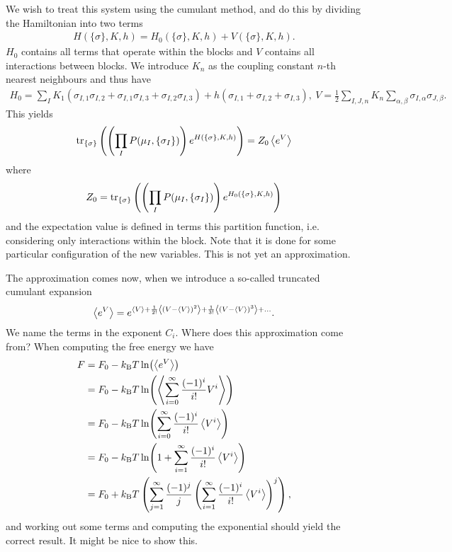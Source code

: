 We wish to treat this system using the cumulant method, and do this by dividing the Hamiltonian into two terms
\begin{align*}
	H(\{\sigma\}, K, h) = H_{0}(\{\sigma\}, K, h) + V(\{\sigma\}, K, h).
\end{align*}
$H_{0}$ contains all terms that operate within the blocks and $V$ contains all interactions between blocks. We introduce $K_{n}$ as the coupling constant $n$-th nearest neighbours and thus have
\begin{align*}
	H_{0} = \sum\limits_{I}K_{1}(\sigma_{I, 1}\sigma_{I, 2} + \sigma_{I, 1}\sigma_{I, 3} + \sigma_{I, 2}\sigma_{I, 3}) + h(\sigma_{I, 1} + \sigma_{I, 2} + \sigma_{I, 3}),\ V = \frac{1}{2}\sum\limits_{I, J, n}K_{n}\sum\limits_{\alpha, \beta}\sigma_{I, \alpha}\sigma_{J, \beta}.
\end{align*}
This yields
\begin{align*}
	\tr\limits_{\{\sigma\}}\left(\left(\prod\limits_{I}P(\mu_{I}, \{\sigma_{I}\})\right)e^{H(\{\sigma\}, K , h)}\right) = Z_{0}\expval{e^{V}}
\end{align*}
where
\begin{align*}
	Z_{0} = \tr\limits_{\{\sigma\}}\left(\left(\prod\limits_{I}P(\mu_{I}, \{\sigma_{I}\})\right)e^{H_{0}(\{\sigma\}, K , h)}\right)
\end{align*}
and the expectation value is defined in terms this partition function, i.e. considering only interactions within the block. Note that it is done for some particular configuration of the new variables. This is not yet an approximation.

The approximation comes now, when we introduce a so-called truncated cumulant expansion
\begin{align*}
	\expval{e^{V}} = e^{\expval{V} + \frac{1}{2!}\expval{(V - \expval{V})^{2}} + \frac{1}{3!}\expval{(V - \expval{V})^{3}} + \dots}.
\end{align*}
We name the terms in the exponent $C_{i}$. Where does this approximation come from? When computing the free energy we have
\begin{align*}
	F &= F_{0} - k_{\text{B}} T\ln(\expval{e^{V}}) \\
	  &= F_{0} - k_{\text{B}} T\ln(\expval{\sum\limits_{i = 0}^{\infty}\frac{(-1)^{i}}{i!}V^{i}}) \\
	  &= F_{0} - k_{\text{B}} T\ln(\sum\limits_{i = 0}^{\infty}\frac{(-1)^{i}}{i!}\expval{V^{i}}) \\
	  &= F_{0} - k_{\text{B}} T\ln(1 + \sum\limits_{i = 1}^{\infty}\frac{(-1)^{i}}{i!}\expval{V^{i}}) \\
	  &= F_{0} + k_{\text{B}} T\left(\sum\limits_{j = 1}^{\infty}\frac{(-1)^{j}}{j}\left(\sum\limits_{i = 1}^{\infty}\frac{(-1)^{i}}{i!}\expval{V^{i}}\right)^{j}\right),
\end{align*}
and working out some terms and computing the exponential should yield the correct result. It might be nice to show this.

